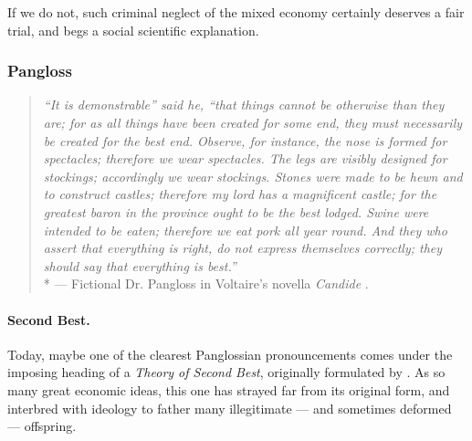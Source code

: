 \documentclass[11pt,a4paper,oneside,openright]{article}
\begin{document}
If we do not, such criminal neglect of the mixed economy certainly deserves a fair trial, and begs a social scientific explanation.


\subsubsection{Pangloss} \label{sec:Pangloss}

\begin{quote}
	\emph{``It is demonstrable'' said he, ``that things cannot be otherwise than they are; for as all things have been created for some end, they must necessarily be created for the best end. 
	Observe, for instance, the nose is formed for spectacles; therefore we wear spectacles. 
	The legs are visibly designed for stockings; accordingly we wear stockings. 
	Stones were made to be hewn and to construct castles; therefore my lord has a magnificent castle; for the greatest baron in the province ought to be the best lodged. 
	Swine were intended to be eaten; therefore we eat pork all year round. 
	And they who assert that everything is right, do not express themselves correctly; they should say that everything is best.''}\\*
	--- Fictional Dr. Pangloss in Voltaire's novella \emph{Candide} \citeyearpar[K125]{Voltaire1759}.
\end{quote}

\paragraph{Second Best.} Today, maybe one of the clearest Panglossian pronouncements comes under the imposing heading of a \emph{Theory of Second Best}, originally formulated by \cite{Lancaster1956}. 
As so many great economic ideas, this one has strayed far from its original form, and interbred with ideology to father many illegitimate --- and sometimes  deformed --- offspring. 
\end{document}
